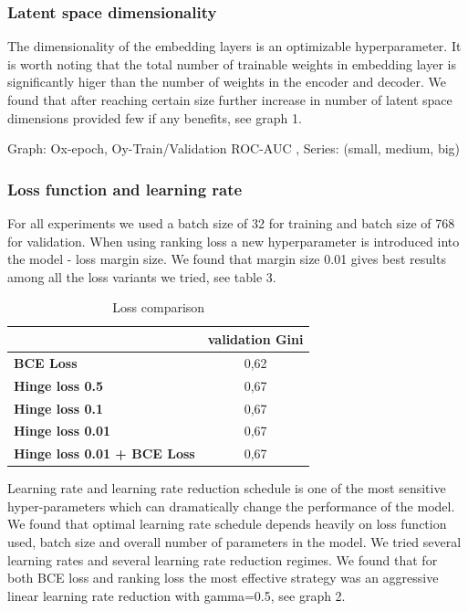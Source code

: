 \documentclass{sigkddExp}
\begin{document}
\subsubsection{Latent space dimensionality}

The dimensionality of the embedding layers is an optimizable hyperparameter. It is worth noting that the total number of trainable weights in embedding layer is significantly higer than the number of weights in the encoder and decoder. We found that after reaching certain size further increase in number of latent space dimensions provided few if any benefits, see graph 1.

Graph: Ox-epoch, Oy-Train/Validation ROC-AUC , Series: (small, medium, big)

\subsubsection{Loss function and learning rate}

For all experiments we used a batch size of 32 for training and batch size of 768 for validation. When using ranking loss a new hyperparameter is introduced into the model - loss margin size. We found that margin size 0.01 gives best results among all the loss variants we tried, see table 3. 

\begin{table}[h]
\caption{Loss comparison}
\begin{tabular}{ | l | c |  }
\hline
& \textbf{validation Gini} \\
\hline
\textbf{BCE Loss} & 0,62  \\
\textbf{Hinge loss 0.5} & 0,67  \\
\textbf{Hinge loss 0.1} & 0,67  \\
\textbf{Hinge loss 0.01} & 0,67  \\
\textbf{Hinge loss 0.01 + BCE Loss} & 0,67  \\
\hline
\end{tabular}
\label{tab4}
\end{table}

Learning rate and learning rate reduction schedule is one of the most sensitive hyper-parameters which can dramatically change the performance of the model.
We found that optimal learning rate schedule depends heavily on loss function used, batch size and overall number of parameters in the model. 
We tried several learning rates and several learning rate reduction regimes. We found that for both BCE loss and ranking loss the most effective strategy was an aggressive linear learning rate reduction with gamma=0.5, see graph 2.
\end{document}
